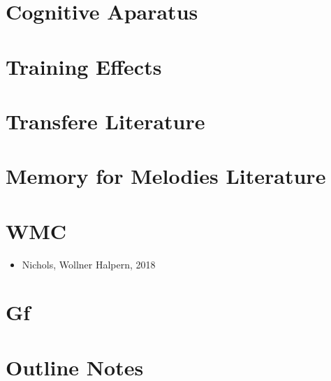 \documentclass[]{book}
\providecommand{\tightlist}{%
  \setlength{\itemsep}{0pt}\setlength{\parskip}{0pt}}
\theoremstyle{definition}
\theoremstyle{definition}
\theoremstyle{definition}
\theoremstyle{remark}
\begin{document}
\hypertarget{cognitive-aparatus}{%
\section{Cognitive Aparatus}\label{cognitive-aparatus}}

\hypertarget{training-effects}{%
\section{Training Effects}\label{training-effects}}

\hypertarget{transfere-literature}{%
\section{Transfere Literature}\label{transfere-literature}}

\hypertarget{memory-for-melodies-literature}{%
\section{Memory for Melodies
Literature}\label{memory-for-melodies-literature}}

\hypertarget{wmc}{%
\section{WMC}\label{wmc}}

\begin{itemize}
\tightlist
\item
  Nichols, Wollner Halpern, 2018
\end{itemize}

\hypertarget{gf}{%
\section{Gf}\label{gf}}

\hypertarget{outline-notes}{%
\section{Outline Notes}\label{outline-notes}}
\end{document}
